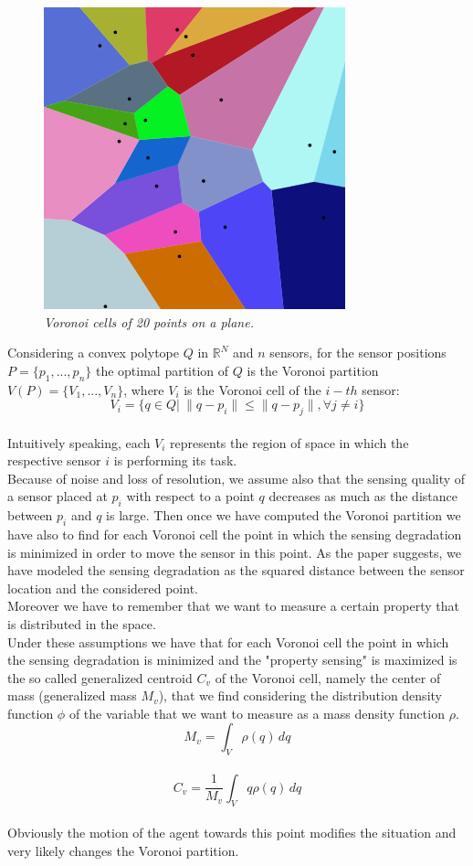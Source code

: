 \documentclass[a4paper,11pt,oneside]{book}
\begin{document}
	\begin{figure}[hb]
		
		\centering
		
		\includegraphics[scale=0.33]{figs/VoronoiPartition.png}
		\caption{\textit{Voronoi cells of 20 points on a plane.}}\label{fig:Voronoi Partition.png}	
	\end{figure}
	

	Considering a convex polytope $Q$ in $\mathbb{R}^N$ and $n$ sensors, for the sensor positions $P=\{p_1,...,p_n\}$ the optimal partition of $Q$ is the Voronoi partition  $V(P)=\{V_1,...,V_n\}$, where $V_i$ is the Voronoi cell of the $i-th$ sensor: $$V_i=\{q\in Q|\> \|q-p_i\|\le\|q-p_j\|, \forall j\not= i\}$$\\
	Intuitively speaking, each $V_i$ represents the region of space in which the respective sensor $i$ is performing its task.\\
	
	
	Because of noise and loss of resolution, we assume also that the sensing quality of a sensor placed at $p_i$ with respect to a point $q$ decreases as much as the distance between $p_i$ and $q$ is large. Then once we have computed the Voronoi partition we have also to find for each Voronoi cell the point in which the sensing degradation is minimized in order to move the sensor in this point. As the paper suggests, we have modeled the sensing degradation as the squared distance between the sensor location and the considered point.\\
	Moreover we have to remember that we want to measure a certain property that is distributed in the space.\\
	Under these assumptions we have that for each Voronoi cell the point in which the sensing degradation is minimized and the "property sensing" is maximized is the so called generalized centroid $C_v$ of the Voronoi cell, namely the center of mass (generalized mass $M_v$), that we find considering the distribution density function $\phi$ of the variable that we want to measure as a mass density function $\rho$.\\
	$$M_v=\int_{V} \rho(q)\, dq$$  \\ 
	$$C_v=\frac{1}{M_v} \int_{V} q \rho(q)\, dq$$  \\
	Obviously the motion of the agent towards this point modifies the situation and very likely changes the Voronoi partition.\\
	
\end{document}

